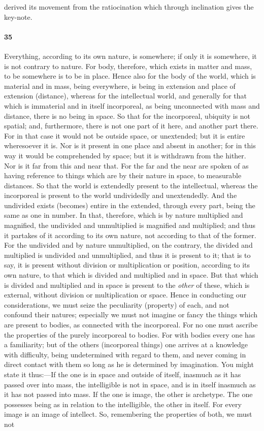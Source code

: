 \documentclass{article}
\begin{document}
derived its movement from the ratiocination which through inclination gives the key-note.

\paragraph{35} Everything, according to its own nature, is somewhere; if only it is somewhere, it is not contrary to nature. For body, therefore, which exists in matter and mass, to be somewhere is to be in place. Hence also for the body of the world, which is material and in mass, being everywhere, is being in extension and place of extension (distance), whereas for the intellectual world, and generally for that which is immaterial and in itself incorporeal, as being unconnected with mass and distance, there is no being in space. So that for the incorporeal, ubiquity is not spatial; and, furthermore, there is not one part of it here, and another part there. For in that case it would not be outside space, or unextended; but it is entire wheresoever it is. Nor is it present in one place and absent in another; for in this way it would be comprehended by space; but it is withdrawn from the hither. Nor is it far from this and near that. For the far and the near are spoken of as having reference to things which are by their nature in space, to measurable distances. So that the world is extendedly present to the intellectual, whereas the incorporeal is present to the world undividedly and unextendedly. And the undivided exists (becomes) entire in the extended, through every part, being the same as one in number. In that, therefore, which is by nature multiplied and magnified, the undivided and unmultiplied is magnified and multiplied; and thus it partakes of it according to its own nature, not according to that of the former. For the undivided and by nature unmultiplied, on the contrary, the divided and multiplied is undivided and unmultiplied, and thus it is present to it; that is to say, it is present without division or multiplication or position, according to its own nature, to that which is divided and multiplied and in space. But that which is divided and multiplied and in space is present to the \textit{other} of these, which is external, without division or multiplication or space. Hence in conducting our considerations, we must seize the peculiarity (property) of each, and not confound their natures; especially we must not imagine or fancy the things which are present to bodies, as connected with the incorporeal. For no one must ascribe the properties of the purely incorporeal to bodies. For with bodies every one has a familiarity; but of the others (incorporeal things) one arrives at a knowledge with difficulty, being undetermined with regard to them, and never coming in direct contact with them so long as he is determined by imagination. You might state it thus:---If the one is in space and outside of itself, inasmuch as it has passed over into mass, the intelligible is not in space, and is in itself inasmuch as it has not passed into mass. If the one is image, the other is archetype. The one possesses being as in relation to the intelligible, the other in itself. For every image is an image of intellect. So, remembering the properties of both, we must not 
\end{document}
